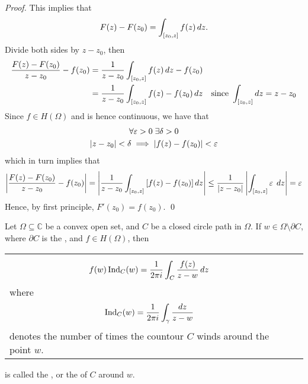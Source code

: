 \documentclass[11pt, oneside]{book}
\begin{document}
\begin{proof}
	This implies that
	\begin{equation*}
		F(z) - F(z_0) = \int_{[z_0, z]} f(z) \dif{z}.
	\end{equation*}
	Divide both sides by $z - z_0$, then
	\begin{align*}
		\frac{F(z) - F(z_0)}{z - z_0} - f(z_0)
			&= \frac{1}{z - z_0} \int_{[z_0, z]} f(z) \dif{z} - f(z_0) \\
			&= \frac{1}{z - z_0} \int_{[z_0, z]} f(z) - f(z_0) \dif{z} \quad \text{since } \int_{[z_0, z]} \dif{z} = z - z_0
	\end{align*}
	Since $f \in H(\Omega)$ and is hence continuous, we have that
	\begin{gather*}
		\forall \epsilon > 0 \; \exists \delta > 0 \\
		\abs{z - z_0} < \delta \implies \abs{f(z) - f(z_0)} < \epsilon
	\end{gather*}
	which in turn implies that
	\begin{equation*}
		\abs{\frac{F(z) - F(z_0)}{z - z_0} - f(z_0)} = \abs{\frac{1}{z - z_0} \int_{[z_0, z]} \left[f(z) - f(z_0)\right] \dif{z}} \leq \frac{1}{\abs{z - z_0}} \abs{\int_{[z_0, z]} \epsilon \; \dif{z}} = \epsilon
	\end{equation*}
	Hence, by first principle, $F'(z_0) = f(z_0)$. \qed
\end{proof}

\begin{thm}\label{thm:cauchy_s_integral_formula_1}
Let $\Omega \subseteq \mathbb{C}$ be a convex open set, and $C$ be a closed circle path in $\Omega$. If $w \in \Omega \setminus \partial C$, where $\partial C$ is the , and $f \in H(\Omega)$, then

	\begin{tabular}{L{10cm} C{5cm}}
		\begin{equation*}
			f(w) \ind{w}{C} = \frac{1}{2 \pi i} \int_{C} \frac{f(z)}{z - w} \dif{z}
		\end{equation*}
		where
		\begin{equation*}
			\ind{w}{C} = \frac{1}{2 \pi i} \int_{\gamma} \frac{\dif{z}}{z - w}
		\end{equation*}
		denotes the number of times the countour $C$ winds around the point $w$.
		&
	\end{tabular}
	is called the , or the  of $C$ around $w$.
\end{thm}
\end{document}
